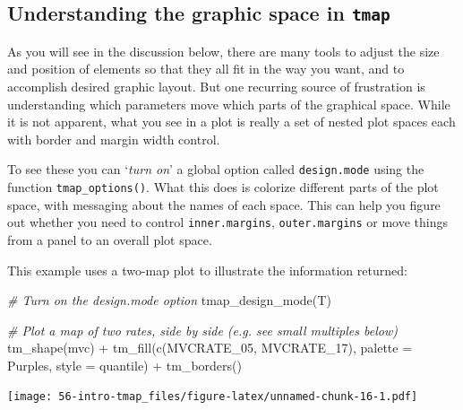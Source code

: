 \documentclass[
]{book}
\newenvironment{Shaded}{\begin{snugshade}}{\end{snugshade}}
\newcommand{\AttributeTok}[1]{\textcolor[rgb]{0.77,0.63,0.00}{#1}}
\newcommand{\CommentTok}[1]{\textcolor[rgb]{0.56,0.35,0.01}{\textit{#1}}}
\newcommand{\FunctionTok}[1]{\textcolor[rgb]{0.00,0.00,0.00}{#1}}
\newcommand{\NormalTok}[1]{#1}
\newcommand{\SpecialCharTok}[1]{\textcolor[rgb]{0.00,0.00,0.00}{#1}}
\newcommand{\StringTok}[1]{\textcolor[rgb]{0.31,0.60,0.02}{#1}}
\begin{document}
\hypertarget{understanding-the-graphic-space-in-tmap}{%
\subsection{\texorpdfstring{Understanding the graphic space in \texttt{tmap}}{Understanding the graphic space in tmap}}\label{understanding-the-graphic-space-in-tmap}}

As you will see in the discussion below, there are many tools to adjust the size and position of elements so that they all fit in the way you want, and to accomplish desired graphic layout. But one recurring source of frustration is understanding which parameters move which parts of the graphical space. While it is not apparent, what you see in a plot is really a set of nested plot spaces each with border and margin width control.

To see these you can `\emph{turn on}' a global option called \texttt{design.mode} using the function \texttt{tmap\_options()}. What this does is colorize different parts of the plot space, with messaging about the names of each space. This can help you figure out whether you need to control \texttt{inner.margins}, \texttt{outer.margins} or move things from a panel to an overall plot space.

This example uses a two-map plot to illustrate the information returned:

\begin{Shaded}
\begin{Highlighting}[]
\CommentTok{\# Turn \textquotesingle{}on\textquotesingle{} the design.mode option}
\FunctionTok{tmap\_design\_mode}\NormalTok{(T)}

\CommentTok{\# Plot a map of two rates, side by side (e.g. see small multiples below)}
\FunctionTok{tm\_shape}\NormalTok{(mvc) }\SpecialCharTok{+} 
  \FunctionTok{tm\_fill}\NormalTok{(}\FunctionTok{c}\NormalTok{(}\StringTok{\textquotesingle{}MVCRATE\_05\textquotesingle{}}\NormalTok{, }\StringTok{\textquotesingle{}MVCRATE\_17\textquotesingle{}}\NormalTok{),}
          \AttributeTok{palette =} \StringTok{\textquotesingle{}Purples\textquotesingle{}}\NormalTok{,}
          \AttributeTok{style =} \StringTok{\textquotesingle{}quantile\textquotesingle{}}\NormalTok{) }\SpecialCharTok{+}
\FunctionTok{tm\_borders}\NormalTok{()}
\end{Highlighting}
\end{Shaded}

\texttt{[image: 56-intro-tmap\_files/figure-latex/unnamed-chunk-16-1.pdf]}
\end{document}
